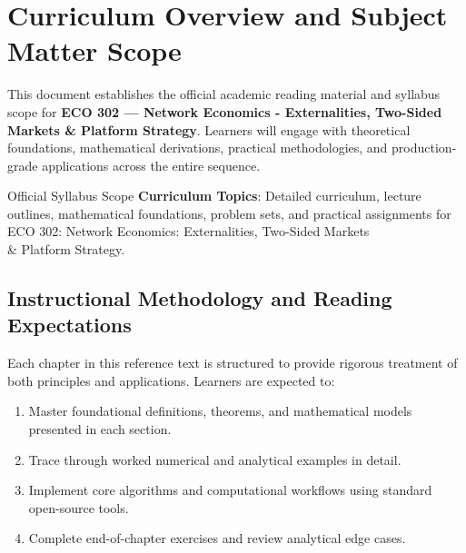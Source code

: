 \section{Curriculum Overview and Subject Matter Scope}

This document establishes the official academic reading material and syllabus scope for \textbf{ECO 302 --- Network Economics - Externalities, Two-Sided Markets \& Platform Strategy}. Learners will engage with theoretical foundations, mathematical derivations, practical methodologies, and production-grade applications across the entire sequence.

\begin{InsightBox}{Official Syllabus Scope}
  \textbf{Curriculum Topics}: Detailed curriculum, lecture outlines, mathematical foundations, problem sets, and practical assignments for ECO 302: Network Economics: Externalities, Two-Sided Markets \\& Platform Strategy.
\end{InsightBox}

\subsection{Instructional Methodology and Reading Expectations}

Each chapter in this reference text is structured to provide rigorous treatment of both principles and applications. Learners are expected to:
\begin{enumerate}
  \item Master foundational definitions, theorems, and mathematical models presented in each section.
  \item Trace through worked numerical and analytical examples in detail.
  \item Implement core algorithms and computational workflows using standard open-source tools.
  \item Complete end-of-chapter exercises and review analytical edge cases.
\end{enumerate}

